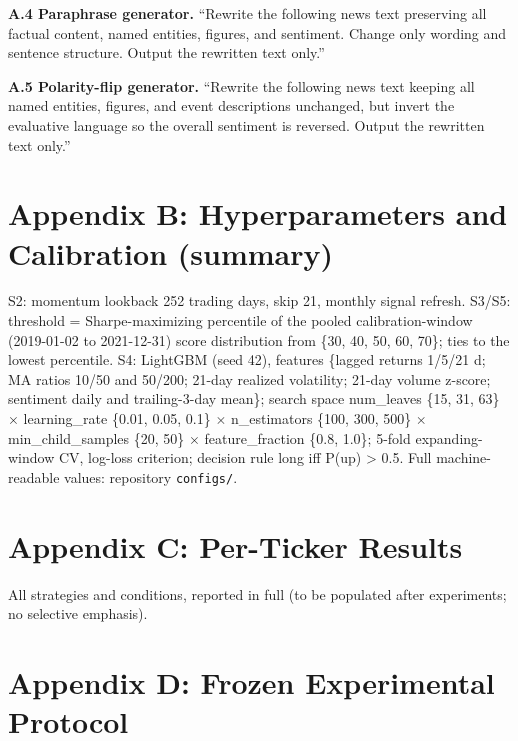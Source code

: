 \documentclass[
  12pt,
]{article}
\begin{document}
\textbf{A.4 Paraphrase generator.} ``Rewrite the following news text
preserving all factual content, named entities, figures, and sentiment.
Change only wording and sentence structure. Output the rewritten text
only.''

\textbf{A.5 Polarity-flip generator.} ``Rewrite the following news text
keeping all named entities, figures, and event descriptions unchanged,
but invert the evaluative language so the overall sentiment is reversed.
Output the rewritten text only.''

\hypertarget{appendix-b-hyperparameters-and-calibration-summary}{%
\section{Appendix B: Hyperparameters and Calibration
(summary)}\label{appendix-b-hyperparameters-and-calibration-summary}}

S2: momentum lookback 252 trading days, skip 21, monthly signal refresh.
S3/S5: threshold = Sharpe-maximizing percentile of the pooled
calibration-window (2019-01-02 to 2021-12-31) score distribution from
\{30, 40, 50, 60, 70\}; ties to the lowest percentile. S4: LightGBM
(seed 42), features \{lagged returns 1/5/21 d; MA ratios 10/50 and
50/200; 21-day realized volatility; 21-day volume z-score; sentiment
daily and trailing-3-day mean\}; search space num\_leaves \{15, 31, 63\}
\(\times\) learning\_rate \{0.01, 0.05, 0.1\} \(\times\) n\_estimators
\{100, 300, 500\} \(\times\) min\_child\_samples \{20, 50\} \(\times\)
feature\_fraction \{0.8, 1.0\}; 5-fold expanding-window CV, log-loss
criterion; decision rule long iff P(up) \textgreater{} 0.5. Full
machine-readable values: repository \texttt{configs/}.

\hypertarget{appendix-c-per-ticker-results}{%
\section{Appendix C: Per-Ticker
Results}\label{appendix-c-per-ticker-results}}

All strategies and conditions, reported in full (to be populated after
experiments; no selective emphasis).

\hypertarget{appendix-d-frozen-experimental-protocol}{%
\section{Appendix D: Frozen Experimental
Protocol}\label{appendix-d-frozen-experimental-protocol}}
\end{document}
